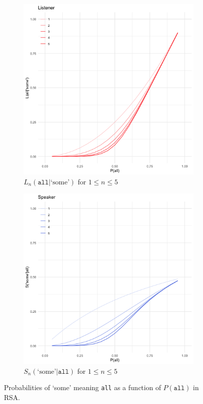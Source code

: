 \documentclass[12pt, a4paper, usenames, dvipsnames]{article}
\begin{document}
\begin{figure}[!htb]
  \begin{subfigure}{.48\linewidth} 
    \includegraphics[width=\textwidth]{graphs/RSA-L.png}
    \caption{\(L_n(\texttt{all}|\text{`some'})\) for \(1\leq n\leq 5\)}
  \end{subfigure}
  \begin{subfigure}{.48\linewidth} 
    \includegraphics[width=\textwidth]{graphs/RSA-S.png}
    \caption{\(S_n(\text{`some'}|\texttt{all})\) for \(1\leq n\leq 5\)}
  \end{subfigure}
  \caption{Probabilities of `some' meaning \texttt{all} as a function of \(P(\texttt{all})\) in RSA.}
  \label{fig:rsa}
\end{figure}
\end{document}
